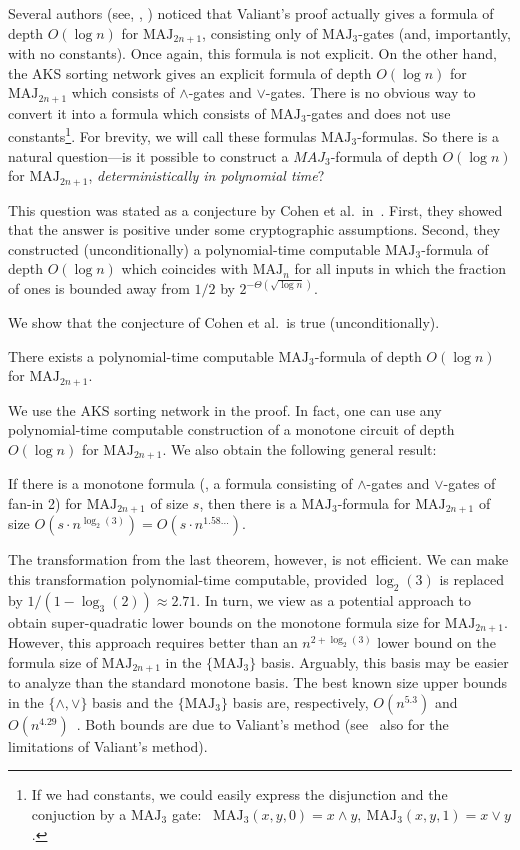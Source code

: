 \documentclass{toc}
\def\MAJ{\mathrm{MAJ}}
\begin{document}
Several authors (see, \eg, \cite{Gol2011,Cohen2013}) noticed that Valiant's proof actually gives 
%
a formula of depth $O(\log n)$  %
for $\MAJ_{2n+1}$, consisting only of $\MAJ_3$-gates (and, importantly, with no constants). Once again, this formula is not explicit. On the other hand, the AKS sorting network gives an explicit
%
formula of depth $O(\log n)$  %
for $\MAJ_{2n + 1}$ which consists of $\land$-gates and $\lor$-gates. There is no obvious way to convert it into a formula which consists of $\MAJ_3$-gates and does not use constants\footnote{If we %
had  %
constants, we could easily express the disjunction and the conjuction by
a $\MAJ_3$ gate:\  %
$\MAJ_3(x, y, 0) = x\land y,\ \MAJ_3(x, y, 1) = x\lor y$.}. For brevity, we will call these formulas $\MAJ_3$-formulas. So there is a natural 
question---is it possible %
to construct 
%
a $MAJ_3$-formula %
of depth $O(\log n)$  %
for $\MAJ_{2n + 1}$, \emph{deterministically in polynomial time}?
 
This question was stated as a conjecture by Cohen et al.~in~\cite{Cohen2013}. First, they showed that the answer is positive under some cryptographic assumptions. %
Second,  %
they constructed (unconditionally) a polynomial-time computable 
%
$\MAJ_3$-formula of depth $O(\log n)$  %
which coincides with $\MAJ_n$ for all inputs in which the fraction of ones is bounded away from $1/2$ by $2^{-\Theta(\sqrt{\log n})}$.

We show that the conjecture of Cohen et al.~is true (unconditionally).

\begin{theorem}
\label{cohen_conj_1}
There exists a polynomial-time computable 
%
$\MAJ_3$-formula of depth $O(\log n)$  %
for $\MAJ_{2n + 1}$.
\end{theorem}
We use the AKS sorting network in the proof. In fact, one can use any polynomial-time computable construction of 
%
a monotone circuit of depth $O(\log n)$  %
for $\MAJ_{2n + 1}$. We also obtain the following general result:

\begin{theorem}
\label{transformation}
If there is a monotone formula (\ie, a formula consisting of $\land$-gates and $\lor$-gates of fan-in 2) for $\MAJ_{2n + 1}$ of size $s$, then there is a $\MAJ_3$-formula for $\MAJ_{2n + 1}$ of size $O(s \cdot n^{\log_2(3)}) = O(s \cdot n^{1.58\ldots})$.
\end{theorem}
The transformation from the last theorem, however, is not efficient. We can make this transformation polynomial-time computable, provided $\log_2(3)$ is replaced by $1/(1 - \log_3(2)) \approx 2.71$.  In turn, we view 
as a potential approach to obtain super-quadratic lower bounds on the monotone formula size for $\MAJ_{2n + 1}$. However, this approach requires better than an $n^{2 +\log_2(3)}$ lower bound on the formula size of $\MAJ_{2n + 1}$ in the $\{\MAJ_3\}$ basis. Arguably, this basis may be easier to analyze than the standard monotone basis. The best known size upper bounds  in the $\{\land, \lor\}$ basis and the $\{\MAJ_3\}$ basis are, respectively, $O(n^{5.3})$ and $O(n^{4.29})$~\cite{GM96}. Both bounds are due to Valiant's method (see~\cite{GM96} also for the limitations of Valiant's method). 
\end{document}
